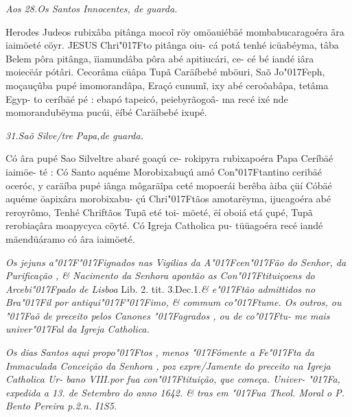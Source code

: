 \documentclass[openany,titlepage,12pt]{book}
\newcommand{\lgS}{\char"017F}
\newcommand{\lgSS}{\char"017F\char"017F}
\begin{document}
\vspace*{2ex}
\begin{center}
    \textit{\footnotesize
Aos 28.Os Santos Innocentes, de guarda.
}
\end{center}

{\hspace*{-2ex}Herodes Judeos rubixâba pitânga moco\~i
röy omöauiébäé mombabucaragoéra âra\linebreak
iaimöeté cöyr. JESUS Chri\lgS to  pitânga oiu-
cá potá tenhé icüabéyma, tâba Belem pôra
pitânga, ïiamundâba pôra abé apitiucári, ce-
cé bé iandé iâra moiecëár pótâri. Cecorâma
cüâpa Tupã Caräíbebé mböuri, Saõ Jo\lgS eph,
moçauçûba pupé imomorandâpa, Eraçó\linebreak
cunum\~i, ixy abé ceroôabâpa, tetâma Egyp-
to ceríbäé pé : ebapó tapeicó, peiebyrãogoâ-
ma recé ixé nde momorandubëyma pucúi,
ëíbé Caräíbebé ixupé.}

\begin{center}
    \textit{\footnotesize
31.Saõ Silve/tre Papa,de guarda.
}
\end{center}

{\hspace*{-2ex}Có âra pupé Sao Silveltre abaré goaçú ce-
rokipyra rubixapoéra Papa Ceríbäé iaimöe-
té : Có Santo aquéme Morobixabuçú amó
Con\lgS tantino ceribäé oceróc, y caräíba pupé
iânga môgaräîpa ceté mopoerái berêba àiba
çüí Cóbäé aquéme öapixâra morobixabu-
çú Chri\lgS tãos amotarëyma, ijucagoéra abé
reroyrômo, Tenhé Chriftãos Tupã eté toi-
möeté, ëí oboiá etá çupé, Tupã rerobiaçâra
moapycyca cöyté. Có Igreja Catholica pu-
tüüagoéra recé iandé mäendüáramo có âra
iaimöeté.}

\textit{\footnotesize\hspace*{-2ex} Os jejuns a\lgSS ignados nas Vigilias da
A\lgS cen\lgS ão do
 Senhor, da Purificação , \& Nacimento da Senhora
apontão as Con\lgS tituiçoens do Arcebi\lgS pado de Lisboa}
{\small Lib. 2. tit. 3.Dec.1.}\textit{\footnotesize\& e\lgS tão admittidos no Bra\lgS il
por antiqui\lgSS imo, \& commum co\lgS tume. Os outros, ou
\lgS aõ de preceito pelos Canones \lgS agrados , ou de co\lgS tu-
me mais univer\lgS al da Igreja Catholica.}

\textit{\footnotesize\hspace*{-2ex} Os dias Santos aqui propo\lgS tos , menos \lgS ómente a
Fe\lgS ta da Immaculada Conceição da Senhora , poz
expre/Jamente do preceito na Igreja Catholica Ur-
bano VIII.por fua con\lgS tituição, que começa. Univer-
\lgS a, expedida a 13. de Setembro do anno 1642. \&
tras em \lgS ua Theol. Moral o P. Bento Pereira p.2.n.
I1S5.}
\end{document}
